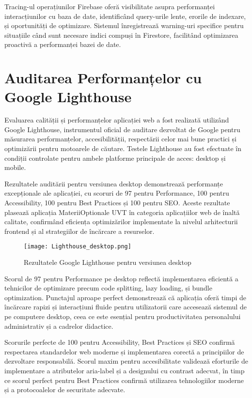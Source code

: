 \documentclass[12pt,a4paper]{report}
\begin{document}
Tracing-ul operațiunilor Firebase oferă visibilitate asupra performanței interacțiunilor cu baza de date, identificând query-urile lente, erorile de indexare, și oportunități de optimizare. Sistemul înregistrează warning-uri specifice pentru situațiile când sunt necesare indici compuși în Firestore, facilitând optimizarea proactivă a performanței bazei de date.

\section{Auditarea Performanțelor cu Google Lighthouse}

Evaluarea calității și performanțelor aplicației web a fost realizată utilizând Google Lighthouse, instrumentul oficial de auditare dezvoltat de Google pentru măsurarea performanțelor, accesibilității, respectării celor mai bune practici și optimizării pentru motoarele de căutare. Testele Lighthouse au fost efectuate în condiții controlate pentru ambele platforme principale de acces: desktop și mobile.

Rezultatele auditării pentru versiunea desktop demonstrează performanțe excepționale ale aplicației, cu scoruri de 97 pentru Performance, 100 pentru Accessibility, 100 pentru Best Practices și 100 pentru SEO. Aceste rezultate plasează aplicația MateriiOptionale UVT în categoria aplicațiilor web de înaltă calitate, confirmând eficiența optimizărilor implementate la nivelul arhitecturii frontend și al strategiilor de încărcare a resurselor.

\begin{figure}[H]
\centering
\texttt{[image: Lighthouse\_desktop.png]}
\caption{Rezultatele Google Lighthouse pentru versiunea desktop}
\label{fig:lighthouse-desktop}
\end{figure}

Scorul de 97 pentru Performance pe desktop reflectă implementarea eficientă a tehnicilor de optimizare precum code splitting, lazy loading, și bundle optimization. Punctajul aproape perfect demonstrează că aplicația oferă timpi de încărcare rapizi și interacțiuni fluide pentru utilizatorii care accesează sistemul de pe computere desktop, ceea ce este esențial pentru productivitatea personalului administrativ și a cadrelor didactice.

Scorurile perfecte de 100 pentru Accessibility, Best Practices și SEO confirmă respectarea standardelor web moderne și implementarea corectă a principiilor de dezvoltare responsabilă. Scorul maxim pentru accesibilitate validează eforturile de implementare a atributelor aria-label și a designului cu contrast adecvat, în timp ce scorul perfect pentru Best Practices confirmă utilizarea tehnologiilor moderne și a protocoalelor de securitate adecvate.
\end{document}
